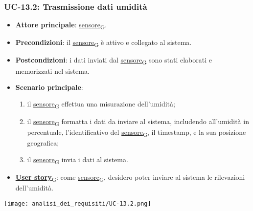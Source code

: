 \subsubsection{UC-13.2: Trasmissione dati umidità}
\begin{itemize}
	\item \textbf{Attore principale}: \href{https://7last.github.io/docs/pb/documentazione-interna/glossario\#sensore}{sensore\textsubscript{G}}.
	\item \textbf{Precondizioni}: il \href{https://7last.github.io/docs/pb/documentazione-interna/glossario\#sensore}{sensore\textsubscript{G}} è attivo e collegato al sistema.
	\item \textbf{Postcondizioni}: i dati inviati dal \href{https://7last.github.io/docs/pb/documentazione-interna/glossario\#sensore}{sensore\textsubscript{G}} sono stati elaborati e memorizzati nel sistema.
	\item \textbf{Scenario principale}:
	      \begin{enumerate}
		      \item il \href{https://7last.github.io/docs/pb/documentazione-interna/glossario\#sensore}{sensore\textsubscript{G}} effettua una misurazione dell'umidità;
		      \item il \href{https://7last.github.io/docs/pb/documentazione-interna/glossario\#sensore}{sensore\textsubscript{G}} formatta i dati da inviare al sistema, includendo all'umidità in percentuale, l'identificativo del \href{https://7last.github.io/docs/pb/documentazione-interna/glossario\#sensore}{sensore\textsubscript{G}},
		            il timestamp, e la sua posizione geografica;
		      \item il \href{https://7last.github.io/docs/pb/documentazione-interna/glossario\#sensore}{sensore\textsubscript{G}} invia i dati al sistema.
	      \end{enumerate}
	\item \href{https://7last.github.io/docs/pb/documentazione-interna/glossario\#user-story}{\textbf{User story}\textsubscript{G}}: come \href{https://7last.github.io/docs/pb/documentazione-interna/glossario\#sensore}{sensore\textsubscript{G}}, desidero poter inviare al sistema le rilevazioni dell'umidità.
\end{itemize}

\begin{center}
	\texttt{[image: analisi\_dei\_requisiti/UC-13.2.png]}
\end{center}


